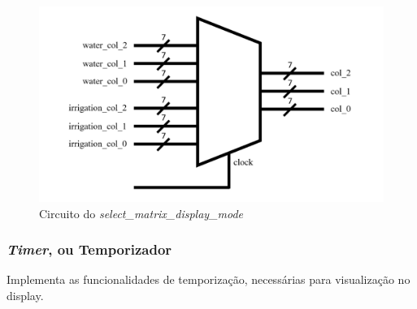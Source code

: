 \documentclass[
	article,			%
	11pt,				%
	oneside,			%
	a4paper,			%
	english,			%
	brazil,				%
	sumario=tradicional
	]{abntex2}
\begin{document}
\begin{itemize}
\begin{figure}[H]
    \centering
    \includegraphics[width=0.5\linewidth]{select_matrix_mode.png}
    \caption{Circuito do \textit{select\_matrix\_display\_mode}}
    \label{fig:select_matrix_display_mode}
\end{figure}
    
\end{itemize}

\subsubsection{\textit{Timer}, ou Temporizador}

Implementa as funcionalidades de temporização, necessárias para visualização no display.
\end{document}
